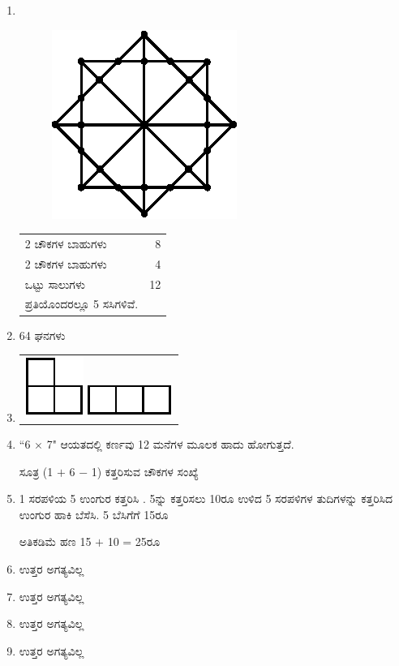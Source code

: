 \begin{enumerate}
\smallskip
\item 
~
\noindent
\begin{minipage}[c]{4cm}
\begin{figure}[H]
\centering
\includegraphics[scale=.85]{images/chap1/ans22.eps}
\end{figure}
\end{minipage}
\begin{minipage}[c]{5cm}
\begin{tabular}{lr}
2 ಚೌಕಗಳ ಬಾಹುಗಳು & 8\\
2 ಚೌಕಗಳ ಬಾಹುಗಳು & 4\\
\hline
ಒಟ್ಟು ಸಾಲುಗಳು & 12\\
\hline
ಪ್ರತಿಯೊಂದರಲ್ಲೂ 5 ಸಸಿಗಳಿವೆ. &
\end{tabular}
\end{minipage}




\item 64 ಘನಗಳು 

\item 
\begin{tabular}[c]{c}
\includegraphics{images/chap1/ans24a.eps}\quad \raisebox{.3cm}{ಅಥವಾ} \quad \includegraphics{images/chap1/ans24b.eps}
\end{tabular}

\item “6 $\times$ 7" ಆಯತದಲ್ಲಿ ಕರ್ಣವು 12 ಮನೆಗಳ ಮೂಲಕ ಹಾದು ಹೋಗುತ್ತದೆ.

ಸೂತ್ರ (1 $+$ 6 $-$ 1) ಕತ್ತರಿಸುವ ಚೌಕಗಳ ಸಂಖ್ಯೆ 

\item 1 ಸರಪಳಿಯ 5 ಉಂಗುರ ಕತ್ತರಿಸಿ . 5ನ್ನು ಕತ್ತರಿಸಲು 10ರೂ ಉಳಿದ 5 ಸರಪಳಿಗಳ ತುದಿಗಳನ್ನು ಕತ್ತರಿಸಿದ ಉಂಗುರ ಹಾಕಿ ಬೆಸೆಸಿ. 5 ಬೆಸಿಗೆಗೆ 15ರೂ 

ಅತಿಕಡಿಮೆ ಹಣ 15 $+$ 10 = 25ರೂ 

\item ಉತ್ತರ ಅಗತ್ಯವಿಲ್ಲ 

\item ಉತ್ತರ ಅಗತ್ಯವಿಲ್ಲ 

\item ಉತ್ತರ ಅಗತ್ಯವಿಲ್ಲ 

\item ಉತ್ತರ ಅಗತ್ಯವಿಲ್ಲ 
\end{enumerate}
